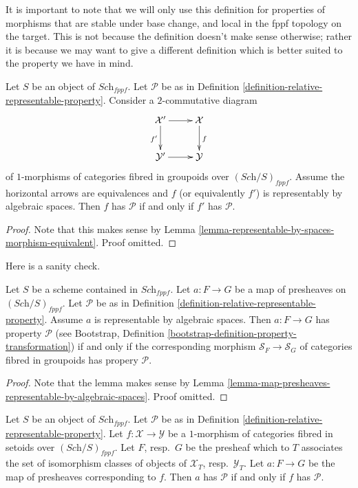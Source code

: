\noindent
It is important to note that we will only use this definition for
properties of morphisms that are stable under base change, and
local in the fppf topology on the target. This is
not because the definition doesn't make sense otherwise; rather it
is because we may want to give a different definition which is
better suited to the property we have in mind.

\begin{lemma}
\label{lemma-property-morphism-equivalent}
Let $S$ be an object of $\textit{Sch}_{fppf}$.
Let $\mathcal{P}$ be as in
Definition \ref{definition-relative-representable-property}.
Consider a $2$-commutative diagram
$$
\xymatrix{
\mathcal{X}' \ar[r] \ar[d]_{f'} & \mathcal{X} \ar[d]^f \\
\mathcal{Y}' \ar[r] & \mathcal{Y}
}
$$
of $1$-morphisms of categories fibred in groupoids over
$(\textit{Sch}/S)_{fppf}$.
Assume the horizontal arrows are equivalences and $f$ (or equivalently $f'$)
is representably by algebraic spaces.
Then $f$ has $\mathcal{P}$ if and only if $f'$ has $\mathcal{P}$.
\end{lemma}

\begin{proof}
Note that this makes sense by
Lemma \ref{lemma-representable-by-spaces-morphism-equivalent}.
Proof omitted.
\end{proof}

\noindent
Here is a sanity check.

\begin{lemma}
\label{lemma-map-presheaves-representable-by-spaces-transformation-property}
Let $S$ be a scheme contained in $\textit{Sch}_{fppf}$.
Let $a : F \to G$ be a map of presheaves on $(\textit{Sch}/S)_{fppf}$.
Let $\mathcal{P}$ be as in
Definition \ref{definition-relative-representable-property}.
Assume $a$ is representable by algebraic spaces.
Then $a : F \to G$ has property $\mathcal{P}$ (see
Bootstrap, Definition \ref{bootstrap-definition-property-transformation})
if and only if the corresponding morphism
$\mathcal{S}_F \to \mathcal{S}_G$ of categories fibred in groupoids
has propery $\mathcal{P}$.
\end{lemma}

\begin{proof}
Note that the lemma makes sense by
Lemma \ref{lemma-map-presheaves-representable-by-algebraic-spaces}.
Proof omitted.
\end{proof}

\begin{lemma}
\label{lemma-map-fibred-setoids-property}
Let $S$ be an object of $\textit{Sch}_{fppf}$. Let $\mathcal{P}$ be as in
Definition \ref{definition-relative-representable-property}.
Let $f : \mathcal{X} \to \mathcal{Y}$ be a $1$-morphism of
categories fibred in setoids over $(\textit{Sch}/S)_{fppf}$.
Let $F$, resp.\ $G$ be the presheaf which to $T$ associates
the set of isomorphism classes of objects of
$\mathcal{X}_T$, resp.\ $\mathcal{Y}_T$.
Let $a : F \to G$ be the map of presheaves corresponding to $f$.
Then $a$ has $\mathcal{P}$ if and only if $f$ has $\mathcal{P}$.
\end{lemma}

